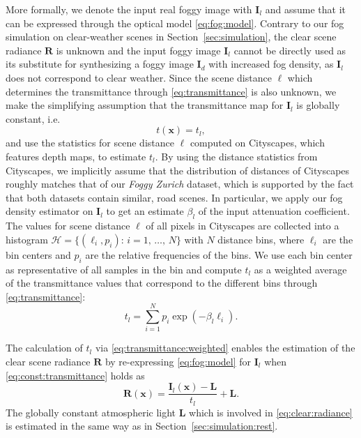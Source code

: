 \documentclass[twocolumn]{svjour3}          \smartqed  \usepackage{graphicx}
\begin{document}
More formally, we denote the input real foggy image with $\mathbf{I}_l$ and assume that it can be expressed through the optical model \eqref{eq:fog:model}. Contrary to our fog simulation on clear-weather scenes in Section~\ref{sec:simulation}, the clear scene radiance $\mathbf{R}$ is unknown and the input foggy image $\mathbf{I}_l$ cannot be directly used as its substitute for synthesizing a foggy image $\mathbf{I}_d$ with increased fog density, as $\mathbf{I}_l$ does not correspond to clear weather. Since the scene distance $\ell$ which determines the transmittance through \eqref{eq:transmittance} is also unknown, we make the simplifying assumption that the transmittance map for $\mathbf{I}_l$ is globally constant, i.e.
\begin{equation} \label{eq:const:transmittance}
t(\mathbf{x}) = t_l,
\end{equation}
and use the statistics for scene distance $\ell$ computed on Cityscapes, which features depth maps, to estimate $t_l$. By using the distance statistics from Cityscapes, we implicitly assume that the distribution of distances of Cityscapes roughly matches that of our \emph{Foggy Zurich} dataset, which is supported by the fact that both datasets contain similar, road scenes. In particular, we apply our fog density estimator on $\mathbf{I}_l$ to get an estimate $\beta_l$ of the input attenuation coefficient. The values for scene distance $\ell$ of all pixels in Cityscapes are collected into a histogram $\mathcal{H} = \{(\ell_i,p_i):\,i=1,\,\dots,\,N\}$ with $N$ distance bins, where $\ell_i$ are the bin centers and $p_i$ are the relative frequencies of the bins. We use each bin center as representative of all samples in the bin and compute $t_l$ as a weighted average of the transmittance values that correspond to the different bins through \eqref{eq:transmittance}:
\begin{equation} \label{eq:transmittance:weighted}
t_l = \sum_{i=1}^N p_i \exp\left(-\beta_l \ell_i\right).
\end{equation}

The calculation of $t_l$ via \eqref{eq:transmittance:weighted} enables the estimation of the clear scene radiance $\mathbf{R}$ by re-expressing \eqref{eq:fog:model} for $\mathbf{I}_l$ when \eqref{eq:const:transmittance} holds as
\begin{equation} \label{eq:clear:radiance}
\mathbf{R}(\mathbf{x}) = \frac{\mathbf{I}_l(\mathbf{x}) - \mathbf{L}}{t_l} + \mathbf{L}.
\end{equation}
The globally constant atmospheric light $\mathbf{L}$ which is involved in \eqref{eq:clear:radiance} is estimated in the same way as in Section~\ref{sec:simulation:rest}.
\end{document}
